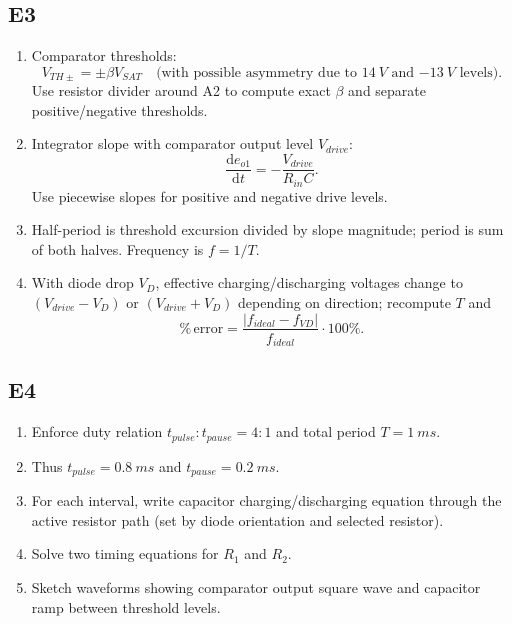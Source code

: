 \documentclass[12pt,a4paper]{article}
\begin{document}
\subsection{E3}
\begin{enumerate}
\item Comparator thresholds:
\[
V_{TH\pm}=\pm \beta V_{SAT}\quad\text{(with possible asymmetry due to }\SI{14}{V}\text{ and }\SI{-13}{V}\text{ levels)}.
\]
Use resistor divider around A2 to compute exact $\beta$ and separate positive/negative thresholds.
\item Integrator slope with comparator output level $V_{drive}$:
\[
\frac{\mathrm{d}e_{o1}}{\mathrm{d}t}=-\frac{V_{drive}}{R_{in}C}.
\]
Use piecewise slopes for positive and negative drive levels.
\item Half-period is threshold excursion divided by slope magnitude; period is sum of both halves. Frequency is $f=1/T$.
\item With diode drop $V_D$, effective charging/discharging voltages change to $(V_{drive}-V_D)$ or $(V_{drive}+V_D)$ depending on direction; recompute $T$ and 
\[
\%\,\text{error}=\frac{|f_{ideal}-f_{VD}|}{f_{ideal}}\cdot100\%.
\]
\end{enumerate}

\subsection{E4}
\begin{enumerate}
\item Enforce duty relation $t_{pulse}:t_{pause}=4:1$ and total period $T=\SI{1}{ms}$.
\item Thus $t_{pulse}=\SI{0.8}{ms}$ and $t_{pause}=\SI{0.2}{ms}$.
\item For each interval, write capacitor charging/discharging equation through the active resistor path (set by diode orientation and selected resistor).
\item Solve two timing equations for $R_1$ and $R_2$.
\item Sketch waveforms showing comparator output square wave and capacitor ramp between threshold levels.
\end{enumerate}
\end{document}
